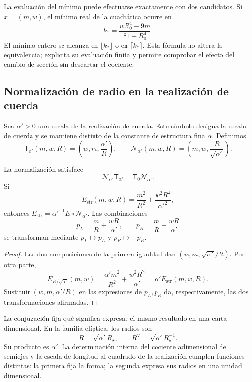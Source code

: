 La evaluación del mínimo puede efectuarse exactamente con dos
candidatos. Si \(x=(m,w)\), el mínimo real de la cuadrática
ocurre en
\[
 k_* =\frac{wR_0^4-9m}{81+R_0^4}.
\]
El mínimo entero se alcanza en \(\lfloor k_*\rfloor\) o en
\(\lceil k_*\rceil\). Esta fórmula no altera la equivalencia;
explicita su evaluación finita y permite comprobar el efecto
del cambio de sección sin descartar el cociente.

\subsection{Normalización de radio en la realización de cuerda}

Sea \(\alpha'>0\) una escala de la realización de cuerda.
Este símbolo designa la escala de cuerda y se mantiene distinto
de la constante de estructura fina \(\alpha\). Definimos
\begin{equation}
 \mathsf T_{\alpha'}(m,w,R)
 =\left(w,m,\frac{\alpha'}R\right),\qquad
 \mathcal N_{\alpha'}(m,w,R)
 =\left(m,w,\frac R{\sqrt{\alpha'}}\right).
 \label{iv:eq:normalizacion-cuerda}
\end{equation}

\begin{theorem}
\label{iv:thm:normalizacion-cuerda}
La normalización satisface
\[
 \mathcal N_{\alpha'}\mathsf T_{\alpha'}
 =\mathsf T_0\mathcal N_{\alpha'}.
\]
Si
\[
 E_{\mathrm{str}}(m,w,R)
 =\frac{m^2}{R^2}+\frac{w^2R^2}{\alpha'^2},
\]
entonces
\(E_{\mathrm{str}}=\alpha'^{-1}E\circ\mathcal N_{\alpha'}\).
Las combinaciones
\[
 p_L=\frac mR+\frac{wR}{\alpha'},\qquad
 p_R=\frac mR-\frac{wR}{\alpha'}
\]
se transforman mediante \(p_L\mapsto p_L\) y \(p_R\mapsto-p_R\).
\end{theorem}
\begin{proof}
Las dos composiciones de la primera igualdad dan
\((w,m,\sqrt{\alpha'}/R)\). Por otra parte,
\[
 E_{R/\sqrt{\alpha'}}(m,w)
 =\frac{\alpha'm^2}{R^2}+\frac{w^2R^2}{\alpha'}
 =\alpha'E_{\mathrm{str}}(m,w,R).
\]
Sustituir \((w,m,\alpha'/R)\) en las expresiones de
\(p_L,p_R\) da, respectivamente, las dos transformaciones
afirmadas.
\end{proof}

La conjugación fija qué significa expresar el mismo resultado en
una carta dimensional. En la familia elíptica, los radios son
\[
 R=\sqrt{\alpha'}R_\star,\qquad
 R^\vee=\sqrt{\alpha'}R_\star^{-1}.
\]
Su producto es \(\alpha'\). La determinación interna del cociente
adimensional de semiejes y la escala de longitud al cuadrado de la
realización cumplen funciones distintas: la primera fija la forma;
la segunda expresa sus radios en una unidad dimensional.

